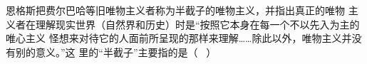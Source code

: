 恩格斯把费尔巴哈等旧唯物主义者称为半截子的唯物主义，并指出真正的唯物
主义者在理解现实世界（自然界和历史）时是``按照它本身在每一个不以先入为主的唯心主义
怪想来对待它的人面前所呈现的那样来理解\ldots{}\ldots{}除此以外，唯物主义并没有别的意义。''这
里的``半截子''主要指的是（ ~）

